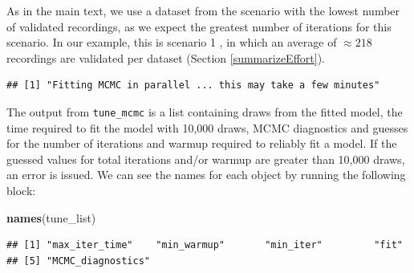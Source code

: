 \documentclass[
]{article}
\newenvironment{Shaded}{\begin{snugshade}}{\end{snugshade}}
\newcommand{\AttributeTok}[1]{\textcolor[rgb]{0.13,0.29,0.53}{#1}}
\newcommand{\DecValTok}[1]{\textcolor[rgb]{0.00,0.00,0.81}{#1}}
\newcommand{\FunctionTok}[1]{\textcolor[rgb]{0.13,0.29,0.53}{\textbf{#1}}}
\newcommand{\NormalTok}[1]{#1}
\newcommand{\OtherTok}[1]{\textcolor[rgb]{0.56,0.35,0.01}{#1}}
\newcommand{\SpecialCharTok}[1]{\textcolor[rgb]{0.81,0.36,0.00}{\textbf{#1}}}
\begin{document}
As in the main text, we use a dataset from the scenario with the lowest number of validated recordings, as we expect the greatest number of iterations for this scenario. In our example, this is scenario 1 , in which an average of \(\approx 218\) recordings are validated per dataset (Section \ref{summarizeEffort}).

\linespread{1}

\begin{Shaded}
\end{Shaded}

\begin{verbatim}
## [1] "Fitting MCMC in parallel ... this may take a few minutes"
\end{verbatim}

\linespread{1}

The output from \texttt{tune\_mcmc} is a list containing draws from the fitted model, the time required to fit the model with 10,000 draws, MCMC diagnostics and guesses for the number of iterations and warmup required to reliably fit a model. If the guessed values for total iterations and/or warmup are greater than 10,000 draws, an error is issued. We can see the names for each object by running the following block:

\linespread{1}

\begin{Shaded}
\begin{Highlighting}[]
\FunctionTok{names}\NormalTok{(tune\_list)}
\end{Highlighting}
\end{Shaded}

\begin{verbatim}
## [1] "max_iter_time"    "min_warmup"       "min_iter"         "fit"             
## [5] "MCMC_diagnostics"
\end{verbatim}
\end{document}
